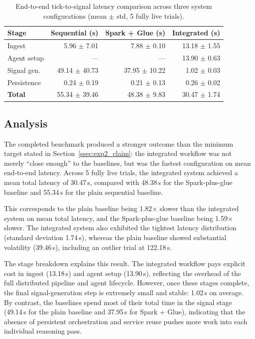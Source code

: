 \documentclass[12pt, a4paper]{report}
\begin{document}
\begin{table}[H]
  \centering
  \caption{End-to-end tick-to-signal latency comparison across three system
  configurations (mean $\pm$ std, 5 fully live trials).}
  \label{tab:e2e_results}
  \begin{tabularx}{\textwidth}{Xrrr}
    \toprule
    \textbf{Stage} &
    \textbf{Sequential (s)} &
    \textbf{Spark + Glue (s)} &
    \textbf{Integrated (s)} \\
    \midrule
    Ingest         & 5.96 $\pm$ 7.01 & 7.88 $\pm$ 0.10 & 13.18 $\pm$ 1.55 \\
    Agent setup    & ---             & ---             & 13.90 $\pm$ 0.63 \\
    Signal gen.    & 49.14 $\pm$ 40.73 & 37.95 $\pm$ 10.22 & 1.02 $\pm$ 0.03 \\
    Persistence    & 0.24 $\pm$ 0.19 & 0.21 $\pm$ 0.13 & 0.26 $\pm$ 0.02 \\
    \midrule
    \textbf{Total} &
    55.34 $\pm$ 39.46 & 48.38 $\pm$ 9.83 & 30.47 $\pm$ 1.74 \\
    \bottomrule
  \end{tabularx}
\end{table}

\subsection{Analysis}
\label{ssec:exp2_analysis}

The completed benchmark produced a stronger outcome than the minimum target stated in
Section~\ref{ssec:exp2_claim}: the integrated workflow was not merely ``close enough''
to the baselines, but was the fastest configuration on mean end-to-end latency.
Across 5 fully live trials, the integrated system achieved a mean total latency of
30.47\,s, compared with 48.38\,s for the Spark-plus-glue baseline and 55.34\,s for the
plain sequential baseline.

This corresponds to the plain baseline being 1.82$\times$ slower than the integrated
system on mean total latency, and the Spark-plus-glue baseline being 1.59$\times$
slower. The integrated system also exhibited the tightest latency distribution
(standard deviation 1.74\,s), whereas the plain baseline showed substantial volatility
(39.46\,s), including an outlier trial at 122.18\,s.

The stage breakdown explains this result. The integrated workflow pays explicit cost in
ingest (13.18\,s) and agent setup (13.90\,s), reflecting the overhead of the full
distributed pipeline and agent lifecycle. However, once these stages complete, the
final signal-generation step is extremely small and stable: 1.02\,s on average.
By contrast, the baselines spend most of their total time in the signal stage
(49.14\,s for the plain baseline and 37.95\,s for Spark + Glue), indicating that the
absence of persistent orchestration and service reuse pushes more work into each
individual reasoning pass.
\end{document}
